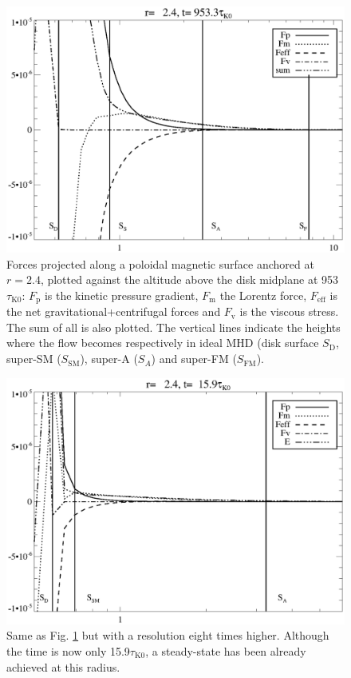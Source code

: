 \documentclass{aa}
\begin{document}
   \begin{figure}
   \centering \includegraphics[width=\columnwidth]{12633f11.eps}
   \caption{ Forces projected along a poloidal magnetic surface anchored at $r=2.4$, plotted against the altitude above the disk midplane at 953$\tau_\mathrm{K0}$: $F_\mathrm{p}$ is the kinetic pressure gradient,
	$F_\mathrm{m}$ the Lorentz force, $F_\mathrm{eff}$ is the net gravitational+centrifugal forces and $F_\mathrm{v}$ is the viscous stress. The sum of all is also plotted. The vertical lines indicate the heights where
	the flow becomes respectively in ideal MHD (disk surface $S_\mathrm{D}$, super-SM ($S_\mathrm{SM}$), super-A ($S_A$) and super-FM ($S_\mathrm{FM}$).  }
              \label{forceLRes}%
    \end{figure}


  \begin{figure}
   \centering \includegraphics[width=\columnwidth]{12633f12.eps}
   \caption{ Same as Fig. \ref{forceLRes} but with a resolution eight times higher. Although the time is now only 15.9$\tau_\mathrm{K0}$, a steady-state has been already achieved at this radius.}
            \label{forceHRes}%
    \end{figure}
\end{document}
